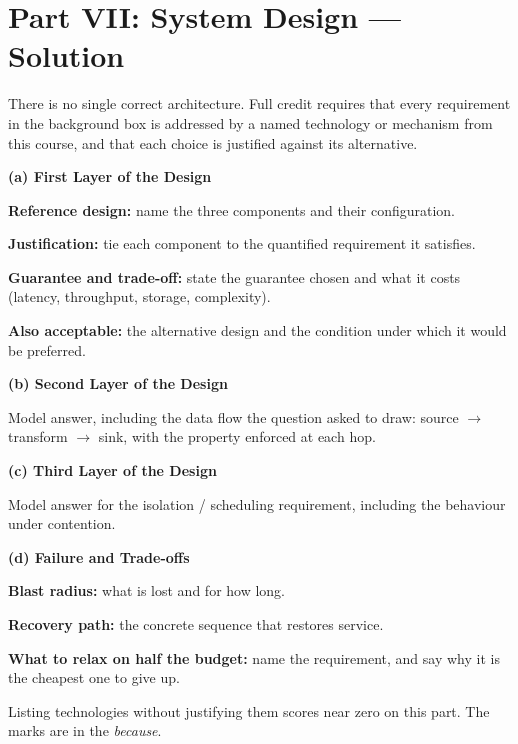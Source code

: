 %

\section*{Part VII: System Design --- Solution}

\begin{keypoint}
There is no single correct architecture. Full credit requires that every
requirement in the background box is addressed by a named technology or
mechanism from this course, and that each choice is justified against its
alternative.
\end{keypoint}

\textbf{(a) First Layer of the Design}
\begin{ans}
\textbf{Reference design:} name the three components and their configuration.

\textbf{Justification:} tie each component to the quantified requirement it
satisfies.

\textbf{Guarantee and trade-off:} state the guarantee chosen and what it costs
(latency, throughput, storage, complexity).

\textbf{Also acceptable:} the alternative design and the condition under which
it would be preferred.
\end{ans}

\textbf{(b) Second Layer of the Design}
\begin{ans}
Model answer, including the data flow the question asked to draw:
source $\rightarrow$ transform $\rightarrow$ sink, with the property enforced
at each hop.
\end{ans}

\textbf{(c) Third Layer of the Design}
\begin{ans}
Model answer for the isolation / scheduling requirement, including the
behaviour under contention.
\end{ans}

\textbf{(d) Failure and Trade-offs}
\begin{ans}
\textbf{Blast radius:} what is lost and for how long.

\textbf{Recovery path:} the concrete sequence that restores service.

\textbf{What to relax on half the budget:} name the requirement, and say why
it is the cheapest one to give up.
\end{ans}

\begin{caution}
Listing technologies without justifying them scores near zero on this part.
The marks are in the \textit{because}.
\end{caution}
